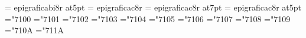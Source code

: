 \def\sixslbf{\font\fzzozznzzt=         epigraficabi8r at6pt \fzzozznzzt}%
\font\fiveslbf=        epigraficabi8r at5pt
%
\def\twentycaps{\font\fzzozznzzt=   epigraficac8r at20pt \fzzozznzzt}%
\def\eighteencaps{\font\fzzozznzzt= epigraficac8r at18pt \fzzozznzzt}%
\def\sixteencaps{\font\fzzozznzzt=  epigraficac8r at16pt \fzzozznzzt}%
\def\fourteencaps{\font\fzzozznzzt=    epigraficac8r at14pt \fzzozznzzt}%
\def\twelvecaps{\font\fzzozznzzt=   epigraficac8r at12pt \fzzozznzzt}%
\font\caps=            epigraficac8r
\def\ninecaps{\font\fzzozznzzt=        epigraficac8r at9pt \fzzozznzzt}%
\def\eightcaps{\font\fzzozznzzt=       epigraficac8r at8pt \fzzozznzzt}%
\font\sevencaps=       epigraficac8r at7pt
\def\sixcaps{\font\fzzozznzzt=         epigraficac8r at6pt \fzzozznzzt}%
\font\fivecaps=        epigraficac8r at5pt%
%
%
\mathchardef\Gamma="7100
\mathchardef\Delta="7101
\mathchardef\Theta="7102
\mathchardef\Lambda="7103
\mathchardef\Xi="7104
\mathchardef\Pi="7105
\mathchardef\Sigma="7106
\mathchardef\Upsilon="7107
%
\mathchardef\Phi="7108
\mathchardef\Psi="7109
\mathchardef\Omega="710A
%
\mathchardef\varrho="711A
%
\rm